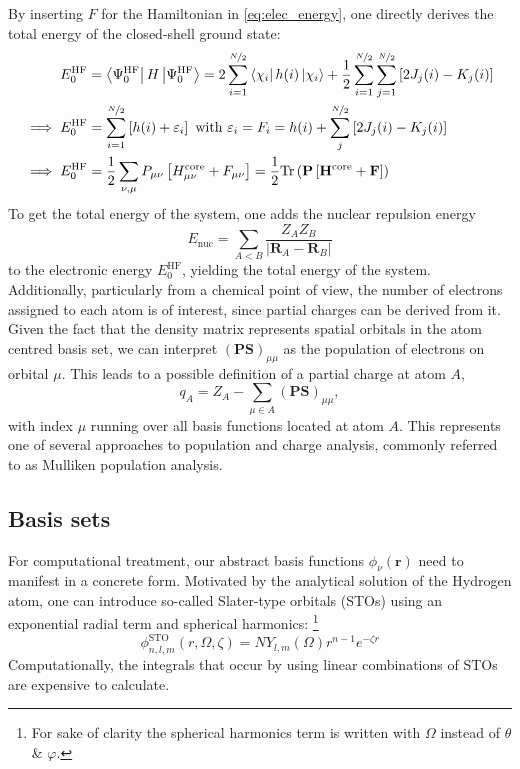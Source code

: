 By inserting $F$ for the Hamiltonian in \autoref{eq:elec_energy}, one directly derives the total energy of the closed-shell ground state: 
\begin{subequations}
\begin{align}
    E^\text{HF}_0 &= \bra{\Psi^\text{HF}_0} H \ket{\Psi^\text{HF}_0} = 2\sum_{i=1}^{\nicefrac{N}{2}} \bra{\chi_i} h(i) \ket{\chi_i}
    + \frac{1}{2}\sum_{i=1}^{\nicefrac{N}{2}}\sum_{j=1}^{\nicefrac{N}{2}} \left[ 2 J_j(i) - K_j(i) \right]\\
    \implies E^\text{HF}_0 &= \sum_{i=1}^{\nicefrac{N}{2}}\left[ h(i) + \varepsilon_i\right] \text{  with  } \varepsilon_i = F_i =  h(i) + \sum_{j}^{\nicefrac{N}{2}} \left[ 2 J_j(i) - K_j(i) \right]\\
    \implies E^\text{HF}_0 &= \frac{1}{2} \sum_{\nu, \mu} P_{\mu \nu} \left[ H_{\mu \nu}^\text{core} + F_{\mu \nu} \right] = \frac{1}{2} \text{Tr} \left( \mathbf{P} \left[ \mathbf{H}^\text{core} + \mathbf{F} \right] \right)
\end{align}
\end{subequations}
To get the total energy of the system, one adds the nuclear repulsion energy 
\begin{equation}
E_\text{nuc} = \sum_{A<B} \frac{Z_A Z_B}{|\mathbf{R}_A - \mathbf{R}_B|}
\end{equation}
to the electronic energy $E^\text{HF}_0$, yielding the total energy of the system. Additionally, particularly from a chemical point of view, the number of electrons assigned to each atom is of interest, since partial charges can be derived from it. Given the fact that the density matrix represents spatial orbitals in the atom centred basis set, we can interpret $\mathbf{(PS)}_{\mu \mu}$ as the population of electrons on orbital $\mu$. This leads to a possible definition of a partial charge at atom $A$,
\begin{equation}
    q_A = Z_A - \sum_{\mu \in A} \mathbf{(PS)}_{\mu \mu},
\end{equation}
with index $\mu$ running over all basis functions located at atom $A$. This represents one of several approaches to population and charge analysis, commonly referred to as Mulliken population analysis. \parencite{ref:mulliken1955electronic}
\subsection{Basis sets}
\label{subsec:background_hf_basis_sets}
For computational treatment, our abstract basis functions $\phi_\nu(\mathbf{r})$ need to manifest in a concrete form. 
Motivated by the analytical solution of the Hydrogen atom, one can introduce so-called Slater-type orbitals (STOs) using an exponential radial term and spherical harmonics: \footnote{For sake of clarity the spherical harmonics term is written with $\Omega$ instead of $\theta$ \& $\varphi$.}
\begin{equation}
    \label{eq:slater_orbital}
    \phi_{n, l, m}^{\text{STO}}(r, \Omega, \zeta) = N Y_{l,m}(\Omega) r^{n-1} e^{-\zeta r}
\end{equation} 
Computationally, the integrals that occur by using linear combinations of STOs are expensive to calculate. 

